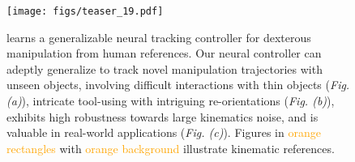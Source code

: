 \begin{figure}[htbp]
  \texttt{[image: figs/teaser\_19.pdf]}
  \vspace{-20pt}
  \caption{ \footnotesize
 \href{https://projectwebsite7.github.io/gene-dex-manip/}{\modelname} learns a generalizable neural tracking controller for dexterous manipulation from human references. Our neural controller can adeptly generalize to track novel manipulation trajectories with unseen objects, involving difficult interactions with thin objects (\emph{Fig. (a)}), intricate tool-using with intriguing re-orientations (\emph{Fig. (b)}),  exhibits high robustness towards large kinematics noise, and is valuable in real-world applications (\emph{Fig. (c)}). Figures in \textcolor{orange}{orange rectangles} with \textcolor{orange}{orange background} illustrate kinematic references.
  }
  \vspace{-1pt}
  \label{fig_intro_teaser}
\end{figure}